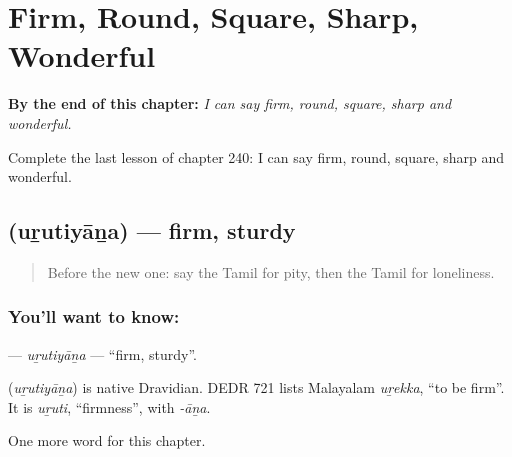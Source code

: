 
\chapter{Firm, Round, Square, Sharp, Wonderful}
\label{ch:ta-firm-round-square-sharp-wonderful}

\begin{chapteropening}
\textbf{By the end of this chapter:} \emph{I can say firm, round, square, sharp and wonderful.}

Complete the last lesson of chapter 240: I can say firm, round, square, sharp and wonderful.
\end{chapteropening}

\section[\texorpdfstring{\ta{உறுதியான} (uṟutiyāṉa)}{உறுதியான (uṟutiyāṉa)}]{ (uṟutiyāṉa) — firm, sturdy}

\label{lesson:TA-C240-urutiyana}



\begin{quote}
Before the new one: say the Tamil for pity, then the Tamil for loneliness.
\end{quote}

\subsection*{You'll want to know: }
\textbf{} — \emph{uṟutiyāṉa} — \textquotedblleft{}firm, sturdy\textquotedblright{}.

\begin{cousinweb}
\textbf{} (\emph{uṟutiyāṉa}) is native Dravidian. DEDR 721 lists Malayalam \emph{uṟekka}, \textquotedblleft{}to be firm\textquotedblright{}. It is \emph{uṟuti}, \textquotedblleft{}firmness\textquotedblright{}, with \emph{-āṉa}.
\end{cousinweb}

\begin{grammarlens}[title={What you've built}]
One more word for this chapter.
\end{grammarlens}

